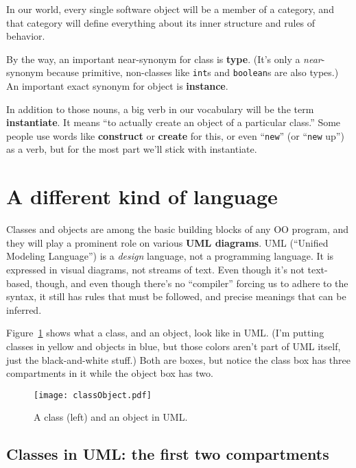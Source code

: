 In our world, every single software object will be a member of a category,
and that category will define everything about its inner structure and rules
of behavior.

By the way, an important near-synonym for class is \textbf{type}. (It's only a
\textit{near}-synonym because primitive, non-classes like \texttt{int}s and
\texttt{boolean}s are also types.) An important exact synonym for object is
\textbf{instance}.

In addition to those nouns, a big verb in our vocabulary will be the term
\textbf{instantiate}. It means ``to actually create an object of a particular
class.'' Some people use words like \textbf{construct} or \textbf{create} for
this, or even ``\texttt{new}'' (or ``\texttt{new} up'') as a verb, but for the
most part we'll stick with instantiate.


\section{A different kind of language}
\label{sec:UMLclasses}

Classes and objects are among the basic building blocks of any OO program, and
they will play a prominent role on various \textbf{UML diagrams}. UML
(``Unified Modeling Language'') is a \textit{design} language, not a
programming language. It is expressed in visual diagrams, not streams of text.
Even though it's not text-based, though, and even though there's no
``compiler'' forcing us to adhere to the syntax, it still has rules that must
be followed, and precise meanings that can be inferred.

Figure~\ref{fig:classObject} shows what a class, and an object, look like in
UML. (I'm putting classes in yellow and objects in blue, but those colors
aren't part of UML itself, just the black-and-white stuff.) Both are boxes,
but notice the class box has three compartments in it while the object box has
two.

\begin{figure}[ht]
\centering
\texttt{[image: classObject.pdf]}   %
\caption{A class (left) and an object in UML.}
\label{fig:classObject}
\end{figure}

\subsection{Classes in UML: the first two compartments}

